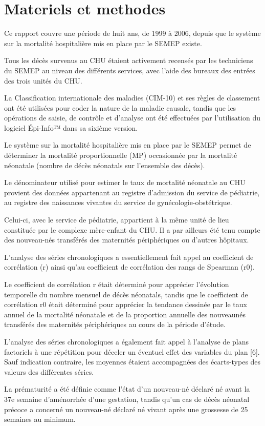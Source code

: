 \section{Materiels et methodes}

Ce rapport couvre une période de huit ans, de 1999 à 2006,
depuis que le système sur la mortalité hospitalière mis en
place par le SEMEP existe. 

Tous les décès survenus au CHU étaient activement recensés par les techniciens 
du SEMEP au niveau des différents services, avec l’aide des bureaux des
entrées des trois unités du CHU.

La Classification internationale des maladies (CIM-10) et ses règles de 
classement ont été utilisées pour coder la nature de la maladie causale, 
tandis que les opérations de saisie, de contrôle et d’analyse ont été effectuées 
par l’utilisation du logiciel Épi-Info™ dans sa sixième version.

Le système sur la mortalité hospitalière mis en place par le SEMEP permet 
de déterminer la mortalité proportionnelle (MP) occasionnée 
par la mortalité néonatale (nombre de décès néonatals sur l’ensemble des décès).

Le dénominateur utilisé pour estimer le taux de mortalité néonatale au CHU
provient des données appartenant au registre d’admission du service de pédiatrie, 
au registre des naissances vivantes du service de gynécologie-obstétrique. 

Celui-ci, avec le service de pédiatrie, appartient à la même unité de lieu 
constituée par le complexe mère-enfant du CHU. Il a par ailleurs été tenu
compte des nouveau-nés transférés des maternités périphériques
ou d’autres hôpitaux.

L’analyse des séries chronologiques a essentiellement fait
appel au coefficient de corrélation (r) ainsi qu’au coefficient
de corrélation des rangs de Spearman (r0).  

Le coefficient de corrélation r était déterminé pour apprécier l’évolution
temporelle du nombre mensuel de décès néonatals, tandis que le coefficient 
de corrélation r0 était déterminé pour apprécier la tendance dessinée par le 
taux annuel de la mortalité néonatale et de la proportion annuelle des nouveaunés
transférés des maternités périphériques au cours de la période d’étude. 

L’analyse des séries chronologiques a également fait appel à l’analyse de plans 
factoriels à une répétition pour déceler un éventuel effet des variables du plan
[6]. Sauf indication contraire, les moyennes étaient accompagnées des écarts-types 
des valeurs des différentes séries.

La prématurité a été définie comme l’état d’un nouveau-né déclaré né avant 
la 37e semaine d’aménorrhée d’une gestation, tandis qu’un cas de décès néonatal 
précoce a concerné un nouveau-né déclaré né vivant après une grossesse 
de 25 semaines au minimum.
